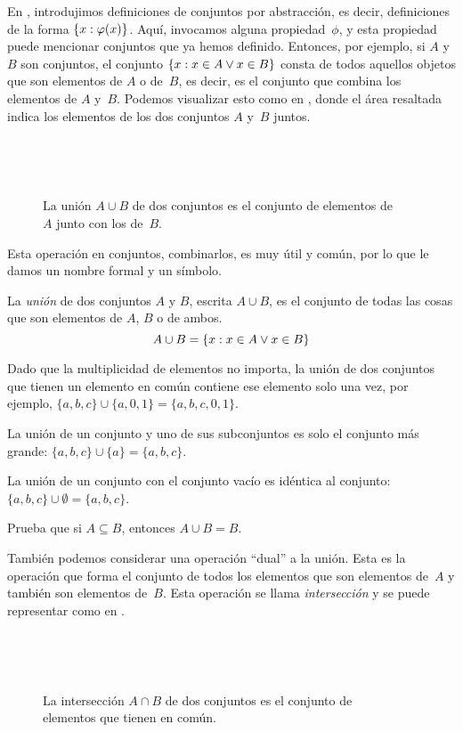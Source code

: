 \documentclass[../../../include/open-logic-section]{subfiles}
\begin{document}

\begin{explain}
En , introdujimos definiciones de conjuntos por abstracción, es decir, definiciones de la forma $\{ x : \varphi(x) \}$. Aquí, invocamos alguna propiedad~$\phi$, y esta propiedad puede mencionar conjuntos que ya hemos definido. Entonces, por ejemplo, si $A$ y~$B$ son conjuntos, el conjunto $\{ x : x \in A \lor x \in B \}$ consta de todos aquellos objetos que son elementos de $A$ o de~$B$, es decir, es el conjunto que combina los elementos de $A$ y~$B$. Podemos visualizar esto como en , donde el área resaltada indica los elementos de los dos conjuntos $A$ y~$B$ juntos.

\begin{figure}
  \caption{La unión $A \cup B$ de dos conjuntos es el conjunto de elementos de
   $A$ junto con los de~$B$.}
\end{figure}

Esta operación en conjuntos, combinarlos, es muy útil y común, por lo que le damos un nombre formal y un símbolo. 
\end{explain}

\begin{defn}[Unión]
La \emph{unión} de dos conjuntos $A$ y $B$, escrita $A \cup B$, es el conjunto de todas las cosas que son elementos de $A$, $B$ o de ambos.
\[
A \cup B = \{ x : x \in A \lor x \in B \}
\]
\end{defn}

\begin{ex}
Dado que la multiplicidad de elementos no importa, la unión de dos conjuntos que tienen un elemento en común contiene ese elemento solo una vez, por ejemplo, $\{ a, b, c\} \cup \{ a, 0, 1\} = \{a, b, c, 0, 1\}$.

La unión de un conjunto y uno de sus subconjuntos es solo el conjunto más grande: $\{a, b, c \} \cup \{a \} = \{a, b, c\}$.

La unión de un conjunto con el conjunto vacío es idéntica al conjunto: $\{a, b, c \} \cup \emptyset = \{a, b, c \}$.
\end{ex}

\begin{prob}
Prueba que si $A \subseteq B$, entonces $A \cup B = B$.
\end{prob}

\begin{explain}
También podemos considerar una operación ``dual'' a la unión. Esta es la operación que forma el conjunto de todos los elementos que son elementos de~$A$ y también son elementos de~$B$. Esta operación se llama \emph{intersección} y se puede representar como en .
\begin{figure}
  \caption{La intersección $A \cap B$ de dos conjuntos es el conjunto de
    elementos que tienen en común.}
\end{figure}
\end{explain}
\end{document}
